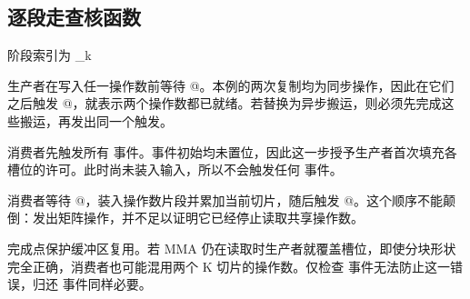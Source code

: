 \subsection*{逐段走查核函数}

阶段索引为 \co@iv_k %

生产者在写入任一操作数前等待 \co@empty[stage]@。本例的两次复制均为同步操作，因此在它们之后触发 \co@full[stage]@，就表示两个操作数都已就绪。若替换为异步搬运，则必须先完成这些搬运，再发出同一个触发。

消费者先触发所有 \co@empty@ 事件。事件初始均未置位，因此这一步授予生产者首次填充各槽位的许可。此时尚未装入输入，所以不会触发任何 \co@full@ 事件。

消费者等待 \co@full[stage]@，装入操作数片段并累加当前切片，随后触发 \co@empty[stage]@。这个顺序不能颠倒：发出矩阵操作，并不足以证明它已经停止读取共享操作数。

完成点保护缓冲区复用。若 MMA 仍在读取时生产者就覆盖槽位，即使分块形状完全正确，消费者也可能混用两个 K 切片的操作数。仅检查 \co@full@ 事件无法防止这一错误，归还 \co@empty@ 事件同样必要。
